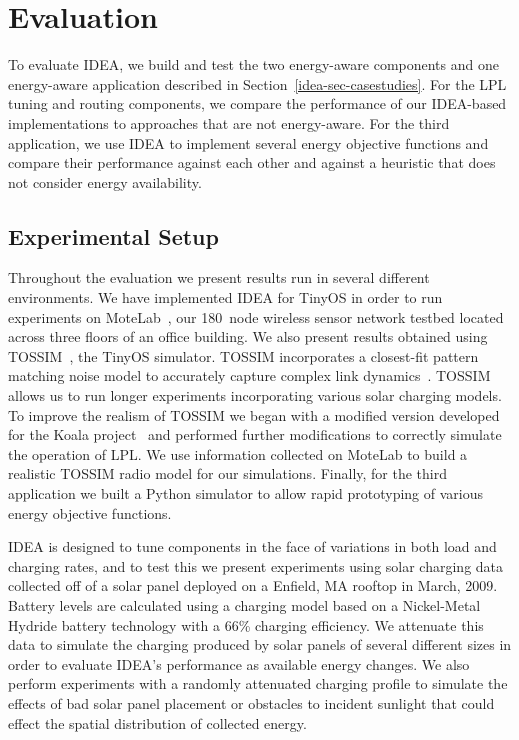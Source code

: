 \section{Evaluation}
\label{idea-sec-evaluation}

To evaluate IDEA, we build and test the two energy-aware components and one
energy-aware application described in Section~\ref{idea-sec-casestudies}. For
the LPL tuning and routing components, we compare the performance of our
IDEA-based implementations to approaches that are not energy-aware. For the
third application, we use IDEA to implement several energy objective
functions and compare their performance against each other and against a
heuristic that does not consider energy availability.

\subsection{Experimental Setup}
\label{idea-subsec-experimentalsetup}

Throughout the evaluation we present results run in several different
environments. We have implemented IDEA for TinyOS in order to run experiments
on MoteLab~\cite{motelab}, our 180~node wireless sensor network testbed
located across three floors of an office building. We also present results
obtained using TOSSIM~\cite{tossim}, the TinyOS simulator. TOSSIM
incorporates a closest-fit pattern matching noise model to accurately capture
complex link dynamics~\cite{cpm-ipsn07}. TOSSIM allows us to run longer
experiments incorporating various solar charging models. To improve the
realism of TOSSIM we began with a modified version developed for the Koala
project~\cite{koala-ipsn08} and performed further modifications to correctly
simulate the operation of LPL. We use information collected on MoteLab to
build a realistic TOSSIM radio model for our simulations. Finally, for the
third application we built a Python simulator to allow rapid prototyping of
various energy objective functions.

IDEA is designed to tune components in the face of variations in both load
and charging rates, and to test this we present experiments using solar
charging data collected off of a solar panel deployed on a Enfield, MA
rooftop in March, 2009. Battery levels are calculated using a charging model
based on a Nickel-Metal Hydride battery technology with a 66\% charging
efficiency. We attenuate this data to simulate the charging produced by solar
panels of several different sizes in order to evaluate IDEA's performance as
available energy changes. We also perform experiments with a randomly
attenuated charging profile to simulate the effects of bad solar panel
placement or obstacles to incident sunlight that could effect the spatial
distribution of collected energy.

